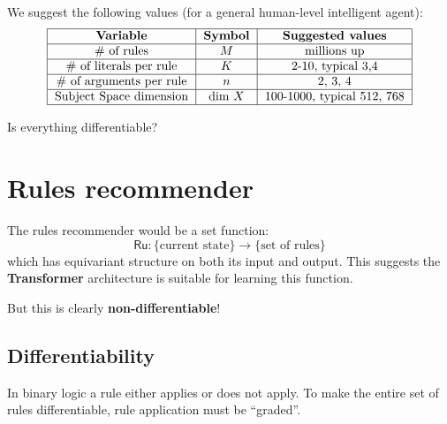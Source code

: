 We suggest the following values (for a general human-level intelligent agent):
\begin{equation}
\begin{tabular}{|c|c|c|}
	\hline
	\textbf{Variable} & \textbf{Symbol} & \textbf{Suggested values} \\
	\hline
	\# of rules & $M$ &  millions up \\
	\hline
	\# of literals per rule & $K$ &  2-10, typical 3,4 \\
	\hline
	\# of arguments per rule & $n$ & 2, 3, 4  \\
	\hline
	Subject Space dimension & dim $X$ &  100-1000, typical 512, 768 \\
	\hline
\end{tabular}
\end{equation}

Is everything differentiable?

\section{Rules recommender}

The rules recommender would be a set function:
\begin{equation}
\mathsf{Ru}: \{ \mbox{current state} \} \rightarrow \{ \mbox{set of rules} \}
\end{equation}
which has equivariant structure on both its input and output.  This suggests the \textbf{Transformer} architecture is suitable for learning this function.

But this is clearly \textbf{non-differentiable}!  

\subsection{Differentiability}

In binary logic a rule either applies or does not apply.  To make the entire set of rules differentiable, rule application must be ``graded''.

